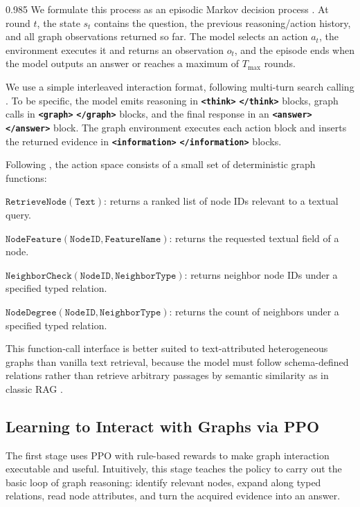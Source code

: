 \documentclass[11pt]{article}
\begin{document}
\begin{spacing}{0.985}
We formulate this process as an episodic Markov decision process \cite{puterman2014markov}.
At round $t$, the state $s_t$ contains the question, the previous reasoning/action history, and all graph observations returned so far.
The model selects an action $a_t$, the environment executes it and returns an observation $o_t$, and the episode ends when the model outputs an answer or reaches a maximum of $T_{\max}$ rounds.

We use a simple interleaved interaction format, following multi-turn search calling \cite{jin2025search}.
To be specific, the model emits reasoning in \textbf{\texttt{<think>}} \textbf{\texttt{</think>}} blocks, graph calls in \textbf{\texttt{<graph>}} \textbf{\texttt{</graph>}} blocks, and the final response in an \textbf{\texttt{<answer>}} \textbf{\texttt{</answer>}} block. The graph environment executes each action block and inserts the returned evidence in \textbf{\texttt{<information>}} \textbf{\texttt{</information>}} blocks.

Following \citet{jin2024graph}, the action space consists of a small set of deterministic graph functions:

\smallskip
\noindent \underline{$\texttt{RetrieveNode}(\texttt{Text})$}: returns a ranked list of node IDs relevant to a textual query.

\smallskip
\noindent \underline{$\texttt{NodeFeature}(\texttt{NodeID}, \texttt{FeatureName})$}: returns the requested textual field of a node.

\smallskip
\noindent \underline{$\texttt{NeighborCheck}(\texttt{NodeID}, \texttt{NeighborType})$}: returns neighbor node IDs under a specified typed relation.

\smallskip
\noindent \underline{$\texttt{NodeDegree}(\texttt{NodeID}, \texttt{NeighborType})$}: returns the count of neighbors under a specified typed relation.

\smallskip
This function-call interface is better suited to text-attributed heterogeneous graphs than vanilla text retrieval, because the model must follow schema-defined relations rather than retrieve arbitrary passages by semantic similarity as in classic RAG \cite{lewis2020retrieval}.

\subsection{Learning to Interact with Graphs via PPO}
\label{sec:ppo}

The first stage uses PPO \cite{schulman2017proximal} with rule-based rewards to make graph interaction executable and useful.
Intuitively, this stage teaches the policy to carry out the basic loop of graph reasoning: identify relevant nodes, expand along typed relations, read node attributes, and turn the acquired evidence into an answer.


\end{spacing}
\end{document}
